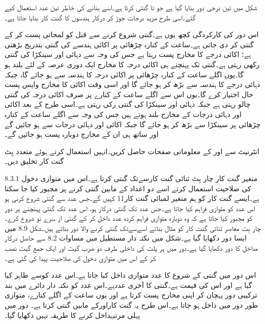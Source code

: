 شکل   میں تین درجی دور بنایا گیا ہے جو  تا  گنتی کرتا ہے۔اسے بنانے کی خاطر تین عدد   استعمال کیے گئے۔اسی طرح مزید درجات جوڑ کر درکار ہندسوں کا  گنت کار بنایا جاتا ہے۔ 


اس دور کی کارکردگی کچھ یوں ہے۔گنتی شروع کرنے سے قبل   کو  لمحاتی  پست کر کے گنتی  کر دی جاتی ہے۔ساعت کے کنارہ چڑھائی پر اکائی  ہندسے کی گنتی بتدریج  بڑھتی ہے؛ اکائی درجے کا مخارج   پست رہتا ہے جس کی وجہ سے دہائی اور سینکڑا کی گنتی رکھی رہتی ہے۔گنتی   تک پہنچتے ہی اکائی درجہ  کا مخارج  ایک دوری عرصہ کے لئے   بلند ہو گا۔یوں اگلے ساعت کے کنارہ چڑھائی  پر اکائی درجہ کا ہندسہ سے   ہو جائے گا، جبکہ دہائی درجے کا ہندسہ  سے بڑھ کر  ہو جائے  گا  اور اسی وقت اکائی کا مخارج    واپس پست  حال اختیار کرے گا۔یوں اس سے اگلے ساعت کے کنارے پر صرف اکائی درجہ کی گنتی چالو رہتی ہے جبکہ دہائی اور سینکڑا کی گنتی  رکی رہتی ہے۔اسی طرح   کے بعد اکائی اور دہائی درجات کے مخارج   بلند ہوتے ہیں جس کی وجہ سے اگلے ساعت کے کنارہ   چڑھائی پر سینکڑا   سے بڑھ کر  ہو جائے گا جبکہ اکائی اور دہائی درجات   سے  ہو جائیں گے اور ساتھ ہی ان کے مخارج    دوبارہ پست ہو جائیں گے۔

انٹرنیٹ سے  اور  کے معلوماتی صفحات حاصل کریں۔انہیں استعمال کرتے ہوئے   متعدد بِٹ گنت کار  تخلیق دیں۔


8.3.1 متغیر گنت کار
	چار بِٹ ثنائی گنت کارسےتک گنتی کرتا ہے۔اس میں متوازی دخول کی صلاحیت استعمال کرتے اسے دو اعداد کے مابین گنتی کرنے پر مجبور کیا جا سکتا ہے۔ایسے گنت کار کو ہم متغیر لمبائی گنت کار11 کہیں گے۔جس عدد سے گنتی شروع کرنی ہو اس عدد کو متوازی فراہم کیا جاتا ہے۔جس عدد تک گنتی درکار ہو، اس عدد تک گنتی پہنچنے پر دور کو مجبور کیا جاتا ہے کہ وہ دوبارہ متوازی فراہم کردہ عدد داخل کر کے گنتی از سرے نو شروع کرے۔
	چار بِٹ معاصر ثنائی گنت کار کو مثال بناتے اسےسےتک گنتی کرنے والا دور بناتے ہیں۔شکل 8.9 میں ایسا دور دکھایا گیا ہے۔شکل میں نکتہ دار مستطیل میں مساوات 8.2 سے حاصل درکار مداخل کا دور دکھایا گیا ہے۔دور میں ہر پلٹ کی داخلی طرف دو ضرب گیٹ اور ایک جمع گیٹ نصب کر کے اس میں متوازی دخول کی صلاحیت پیدا کی گئی ہے۔

	اس دور میں گنتی کے شروع کا عدد متوازی داخل کیا جاتا ہے۔اس عدد کوسے ظاہر کیا گیا ہے اور اس کی قیمت ہے۔گنتی کا آخری عددہے۔اس عدد کو نکتہ دار دائرے میں بند ترکیبی دور پہچان کر اپنی مخارج پست کرتا ہے اور یوں ساعت کے اگلے کنارے،  متوازی طور دور میں داخل ہو جاتا ہے۔اس طرح یہ  گنت کاراورکے مابین گنتی کرتا ہے۔
	دور میں پہلی مرتبہداخل کرنے کا طریقہ نہیں دکھایا گیا۔

